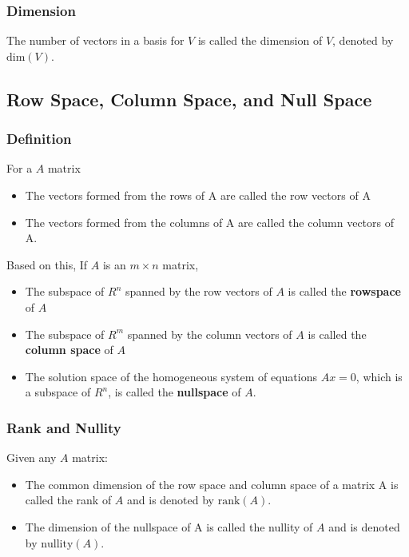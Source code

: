 \documentclass[a4paper,12pt]{article}
\begin{document}
\subsubsection*{Dimension}
The number of vectors in a basis for \(V\) is called the dimension of \(V\), denoted by \(\text{dim}(V)\).

\subsection*{Row Space, Column Space, and Null Space}
\subsubsection*{Definition}
For a \(A\) matrix \begin{itemize}
  \item The vectors formed from the rows of A are called the row vectors of A
  \item The vectors formed from the columns of A are called the column vectors of A.
\end{itemize}
Based on this, If \(A\) is an \(m\times n\) matrix, \begin{itemize}
  \item The subspace of \(R^n\) spanned by the row vectors of \(A\) is called the \textbf{rowspace} of \(A\)
  \item The subspace of \(R^m\) spanned by the column vectors of \(A\) is called the \textbf{column space} of \(A\)
  \item The solution space of the homogeneous system of equations \(Ax=0\), which is a subspace of \(R^n\), is called the \textbf{nullspace} of \(A\).
\end{itemize}

\subsubsection*{Rank and Nullity}
Given any \(A\) matrix:
\begin{itemize}
  \item The common dimension of the row space and column space of a matrix A is called the rank of \(A\) and is denoted by \(\text{rank}(A)\).
  \item The dimension of the nullspace of A is called the nullity of \(A\) and is denoted by \(\text{nullity}(A)\).
\end{itemize}
\end{document}
